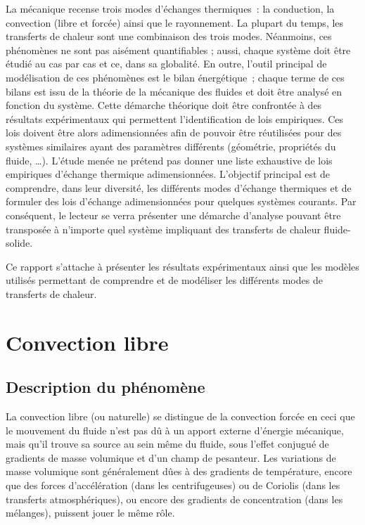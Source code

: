 \documentclass[14pt]{article}
\begin{document}
La mécanique recense trois modes d’échanges thermiques : la conduction, la convection (libre et forcée) ainsi que le rayonnement. La plupart du temps, les transferts de chaleur sont une combinaison des trois modes. Néanmoins, ces phénomènes ne sont pas aisément quantifiables ; aussi, chaque système doit être étudié au cas par cas et ce, dans sa globalité. En outre, l’outil principal de modélisation de ces phénomènes est le bilan énergétique ; chaque terme de ces bilans est issu de la théorie de la mécanique des fluides et doit être analysé en fonction du système. Cette démarche théorique doit être confrontée à des résultats expérimentaux qui permettent l’identification de lois empiriques. Ces lois doivent être alors adimensionnées afin de pouvoir être réutilisées pour des systèmes similaires ayant des paramètres différents (géométrie, propriétés du fluide, …). L’étude menée ne prétend pas donner une liste exhaustive de lois empiriques d’échange thermique adimensionnées. L’objectif principal est de comprendre, dans leur diversité, les différents modes d’échange thermiques et de formuler des lois d'échange adimensionnées pour quelques systèmes courants. Par conséquent, le lecteur se verra présenter une démarche d’analyse pouvant être transposée à n’importe quel système impliquant des transferts de chaleur fluide-solide.

Ce rapport s’attache à présenter les résultats expérimentaux ainsi que les modèles utilisés permettant de comprendre et de modéliser les différents modes de transferts de chaleur.

\newpage
\section{Convection libre}
\subsection{Description du phénomène}
La convection libre (ou naturelle) se distingue de la convection forcée en ceci que le mouvement du fluide n’est pas dû à un apport externe d’énergie mécanique, mais qu’il trouve sa source au sein même du fluide, sous l’effet conjugué de gradients de masse volumique et d’un champ de pesanteur. Les variations de masse volumique sont généralement dûes à des gradients de température, encore que des forces d’accélération (dans les centrifugeuses) ou de Coriolis (dans les transferts atmosphériques), ou encore des gradients de concentration (dans les mélanges), puissent jouer le même rôle.
\end{document}
